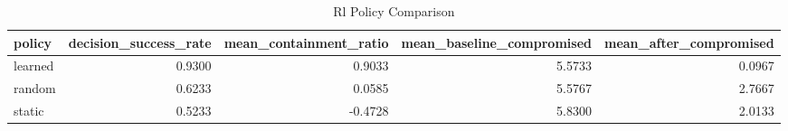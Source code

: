 \begin{table}
\caption{Rl Policy Comparison}
\label{tab:rl_policy_comparison}
\begin{tabular}{lrrrr}
\toprule
policy & decision_success_rate & mean_containment_ratio & mean_baseline_compromised & mean_after_compromised \\
\midrule
learned & 0.9300 & 0.9033 & 5.5733 & 0.0967 \\
random & 0.6233 & 0.0585 & 5.5767 & 2.7667 \\
static & 0.5233 & -0.4728 & 5.8300 & 2.0133 \\
\bottomrule
\end{tabular}
\end{table}
